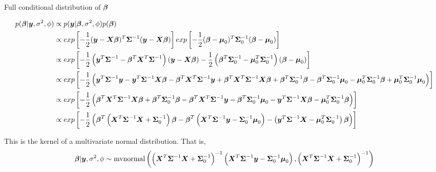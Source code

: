 \documentclass[12pt]{article}
\newcommand{\bfy}{\mbox{\boldmath $y$}}
\newcommand{\bfX}{\mbox{\boldmath $X$}}
\newcommand{\bfb}{\mbox{\boldmath $\beta$}}
\newcommand{\bfS}{\mbox{\boldmath $\Sigma$}}
\newcommand{\bfu}{\mbox{\boldmath $\mu$}}
\begin{document}
\begin{landscape}
\begin{center}
	Full conditional distribution of $\bfb$
\end{center}
\begin{equation*}
\begin{split}
p(\bfb|\bfy, \sigma^2, \phi) &\propto p(\bfy|\bfb, \sigma^2, \phi)p(\bfb) \\
&\propto exp\left[-\frac{1}{2}(\bfy - \bfX\bfb)^T\bfS^{-1}(\bfy - \bfX\bfb)\right]exp\left[-\frac{1}{2}(\bfb - \bfu_0)^T\bfS_0^{-1}(\bfb - \bfu_0)\right] \\
&\propto exp\left[ -\frac{1}{2}\left(\bfy^T\bfS^{-1} - \bfb^T\bfX^T\bfS^{-1}\right)\left(\bfy - \bfX\bfb\right) - \frac{1}{2}\left(\bfb^T\bfS_0^{-1} - \bfu_0^T\bfS_0^{-1}\right)\left(\bfb - \bfu_0\right)\right] \\
&\propto exp\left[-\frac{1}{2}\left( \bfy^T\bfS^{-1}\bfy - \bfy^T\bfS^{-1}\bfX\bfb - \bfb^T\bfX^T\bfS^{-1}\bfy + \bfb^T\bfX^T\bfS^{-1}\bfX\bfb + \bfb^T\bfS_0^{-1}\bfb - \bfb^T\bfS_0^{-1}\bfu_0 - \bfu_0^T\bfS_0^{-1}\bfb + \bfu_0^T\bfS_0^{-1}\bfu_0 \right)\right] \\
&\propto exp\left[-\frac{1}{2}\left(\bfb^T\bfX^T\bfS^{-1}\bfX\bfb + \bfb^T\bfS_0^{-1}\bfb - \bfb^T\bfX^T\bfS^{-1}\bfy - \bfb^T\bfS_0^{-1}\bfu_0 - \bfy^T\bfS^{-1}\bfX\bfb - \bfu_0^T\bfS_0^{-1}\bfb \right)\right] \\
&\propto exp\left[-\frac{1}{2}\left(\bfb^T\left(\bfX^T\bfS^{-1}\bfX + \bfS_0^{-1}\right)\bfb - \bfb^T\left(\bfX^T\bfS^{-1}\bfy - \bfS_0^{-1}\bfu_0\right) - \left(\bfy^T\bfS^{-1}\bfX - \bfu_0^T\bfS_0^{-1}\right)\bfb \right)\right]
\end{split}
\end{equation*}

This is the kernel of a multivariate normal distribution. That is,
\begin{equation*}
\begin{split}
\bfb|\bfy, \sigma^2, \phi \sim \text{mvnormal}\left(\left(\bfX^T\bfS^{-1}\bfX + \bfS_0^{-1}\right)^{-1}\left(\bfX^T\bfS^{-1}\bfy - \bfS_0^{-1}\bfu_0\right), \left(\bfX^T\bfS^{-1}\bfX + \bfS_0^{-1}\right)^{-1}\right)
\end{split}
\end{equation*}
\end{landscape}	

\newpage
{}
\end{document}
